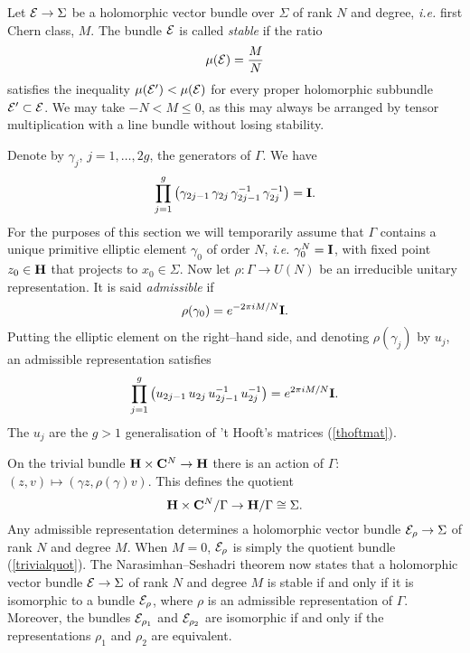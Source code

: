 \documentclass[a4paper,a4paper]{article}
\begin{document}
Let ${\cal  E}\rightarrow \Sigma$  be a holomorphic vector bundle over $\Sigma$ 
of rank $N$ and degree, {\it i.e.} first Chern class, $M$. The bundle ${\cal  E}$ 
is called {\it stable} if the ratio  
\begin{equation}  
\mu({\cal  E})={M\over N}  
\label{ratio}  
\end{equation}  
satisfies the inequality  
$\mu({\cal  E}')<\mu({\cal  E})$ for every proper holomorphic subbundle   
${\cal  E}'\subset {\cal  E}$. We may take $-N<M\leq 0$, as this may always 
be arranged by tensor multiplication with a line bundle without losing stability. 

Denote by $\gamma_j$, $j=1,\ldots, 2g$, the generators of $\Gamma$. We have
\begin{equation}  
\prod_{j=1}^g \left(\gamma_{2j-1}\,\gamma_{2j}\,
\gamma_{2j-1}^{-1}\, \gamma_{2j}^{-1}\right)={\bf I}.  
\label{genex}  
\end{equation}
For the purposes of this section we will temporarily assume that  
$\Gamma$ contains a unique primitive elliptic element $\gamma_0$ of 
order $N$, {\it i.e.} $\gamma_0^N={{\bf  I}}$, with fixed point $z_0\in{{\bf  
H}}$ that projects to $x_0\in\Sigma$. Now let $\rho:\Gamma\to U(N)$ 
be an irreducible unitary representation. It is said  {\it admissible} if  
\begin{equation}  
\rho(\gamma_0)=e^{-2\pi i M/N}{{\bf  I}}.  
\label{ammissibile}
\end{equation}  
Putting the elliptic element on the right--hand side, and denoting  
$\rho(\gamma_j)$ by  $u_j$, an admissible representation satisfies  
\begin{equation}  
\prod_{j=1}^g \left(u_{2j-1}\,u_{2j}\,u_{2j-1}^{-1}\, u_{2j}^{-1}\right)=  
e^{2\pi iM/N}{{\bf  I}}.  
\label{nsmatrices}
\end{equation}  
The $u_j$ are the $g>1$ generalisation of 't Hooft's matrices (\ref{thoftmat}).  
  
On the trivial bundle ${{\bf H}}\times {{\bf C}}^N\rightarrow {{\bf  
H}}$ there is an action of $\Gamma$:  
$(z, v)\mapsto(\gamma z, \rho(\gamma)v)$.  This defines the quotient  
\begin{equation}  
{{\bf H}}\times {{\bf C}}^N/\Gamma\rightarrow {{\bf H}}/\Gamma\cong\Sigma.  
\label{trivialquot}  
\end{equation}  
Any admissible representation determines a holomorphic vector bundle  
${\cal  E}_{\rho}\rightarrow \Sigma$ of rank $N$ and degree $M$. When $M=0$,  
${\cal  E}_{\rho}$ is simply the  quotient bundle (\ref{trivialquot}).  
The Narasimhan--Seshadri theorem  now states that a holomorphic vector bundle 
${\cal  E}\rightarrow\Sigma$ of rank $N$ 
and degree  $M$  is stable if and only if it is isomorphic to a  bundle 
${\cal  E}_{\rho}$, where $\rho$  is an admissible representation of $\Gamma$. 
Moreover, the bundles ${\cal  E}_{\rho_1}$ and ${\cal  E}_{\rho_2}$ are isomorphic  
if and only if the representations $\rho_1$ and $\rho_2$ are equivalent.
\end{document}
